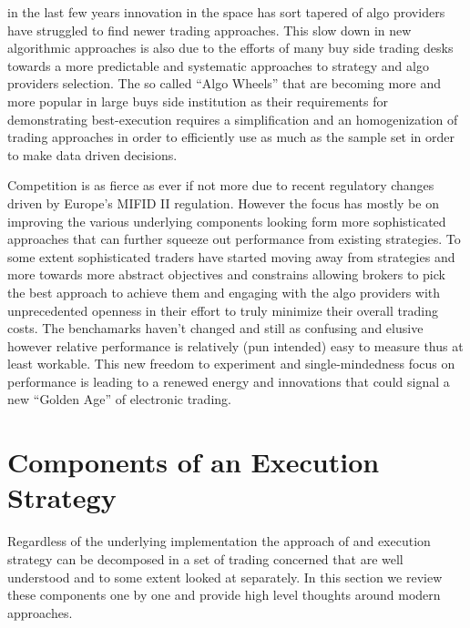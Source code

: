 in the last few years innovation in the space has sort tapered of algo providers have struggled to find newer trading approaches. This slow down in new algorithmic approaches is also due to the efforts of many buy side trading desks towards a more predictable and systematic approaches to strategy and algo providers selection. The so called ``Algo Wheels'' that are becoming more and more popular in large buys side institution as their requirements for demonstrating best-execution requires a simplification and an homogenization of trading approaches in order to  efficiently use as much as the sample set in order to make data driven decisions. 

Competition is as fierce as ever if not more due to recent regulatory changes driven by Europe's MIFID II regulation.  However the focus has mostly be on improving the various underlying components looking form more sophisticated approaches that can further squeeze out performance from existing strategies. To some extent sophisticated traders have started moving away from strategies and more towards more abstract objectives and constrains allowing brokers to pick the best approach to achieve them and engaging with the algo providers with unprecedented openness in their effort to truly minimize their overall trading costs. The benchamarks haven't changed and still as confusing and elusive however relative performance is relatively (pun intended) easy to measure thus at least workable. This new freedom to experiment and single-mindedness focus on performance is leading to a renewed energy and innovations that could signal a new ``Golden Age'' of electronic trading.

\section{Components of an Execution Strategy}

Regardless of the underlying implementation the approach of and execution strategy can be decomposed in a set of trading concerned that are well understood and to some extent looked at separately. In this section we review these components one by one and provide high level thoughts around modern approaches.

